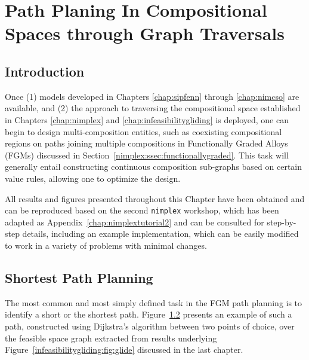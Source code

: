 \chapter{Path Planing In Compositional Spaces through Graph Traversals} \label{chap:pathplanning}


\section{Introduction} \label{pathplan:sec:intro}

Once (1) models developed in Chapters \ref{chap:sipfenn} through \ref{chap:nimcso} are available, and (2) the approach to traversing the compositional space established in Chapters \ref{chap:nimplex} and \ref{chap:infeasibilitygliding} is deployed, one can begin to design multi-composition entities, such as coexisting compositional regions on paths joining multiple compositions in Functionally Graded Alloys (FGMs) discussed in Section~\ref{nimplex:ssec:functionallygraded}. This task will generally entail constructing continuous composition sub-graphs based on certain value rules, allowing one to optimize the design.

All results and figures presented throughout this Chapter have been obtained and can be reproduced based on the second \texttt{nimplex} workshop, which has been adapted as Appendix~\ref{chap:nimplextutorial2} and can be consulted for step-by-step details, including an example implementation, which can be easily modified to work in a variety of problems with minimal changes.

\section{Shortest Path Planning} \label{pathplan:sec:shortest}

The most common and most simply defined task in the FGM path planning is to identify a short \cite{Bobbio2022DesignCompositions} or the shortest path. Figure~\ref{pathplan:sec:shortest} presents an example of such a path, constructed using Dijkstra's algorithm \cite{Dijkstra1959AGraphs} between two points of choice, over the feasible space graph extracted from results underlying Figure~\ref{infeasibilitygliding:fig:glide} discussed in the last chapter. 

